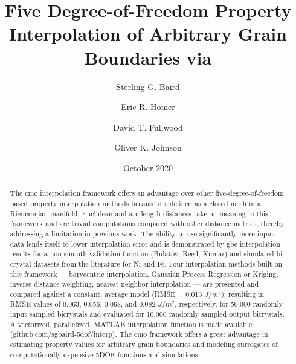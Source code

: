 \documentclass[preprint,12pt]{elsarticle}
\title{Five Degree-of-Freedom Property Interpolation of Arbitrary Grain Boundaries via \glsentrytitlecase{cmo}{long}}
\author{Sterling G. Baird}
\author{Eric R. Homer}
\author{David T. Fullwood}
\author{Oliver K. Johnson\corref{cor1}}
\date{October 2020}
\begin{document}
\begin{abstract}
    The \acrlong{cmo} interpolation framework offers an advantage over other five-degree-of-freedom based property interpolation methods because it's defined as a closed mesh in a Riemannian manifold. Euclidean and arc length distances take on meaning in this framework and are trivial computations compared with other distance metrics, thereby addressing a limitation in previous work. The ability to use significantly more input data lends itself to lower interpolation error and is demonstrated by \acrlong{gbe} interpolation results for a non-smooth validation function (Bulatov, Reed, Kumar) and simulated bi-crystal datasets from the literature for Ni and Fe. Four interpolation methods built on this framework --- barycentric interpolation, Gaussian Process Regression or Kriging, inverse-distance weighting, nearest neighbor interpolation --- are presented and compared against a constant, average model (RMSE = 0.013 $J/m^2$), resulting in RMSE values of 0.063, 0.056, 0.068, and 0.082 $J/m^2$, respectively, for 50,000 randomly input sampled bicrystals and evaluated for 10,000 randomly sampled output bicrystals. A vectorized, parallelized, MATLAB interpolation function is made available (github.com/sgbaird-5dof/interp). The \acrlong{cmo} framework offers a great advantage in estimating property values for arbitrary grain boundaries and modeling surrogates of computationally expensive 5DOF functions and simulations.
\end{abstract}
\end{document}
